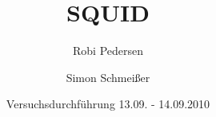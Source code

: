 \documentclass[a4paper,oneside]{scrartcl} %
\title{SQUID}
\author{Robi Pedersen \and Simon Schmeißer}
\date{Versuchsdurchführung 13.09. - 14.09.2010}
\begin{document}
\begin{titlepage}
  \maketitle
  \vfill
  \thispagestyle{empty}
\end{titlepage}

\tableofcontents
\clearpage








\clearpage

% 
%
\end{document}
